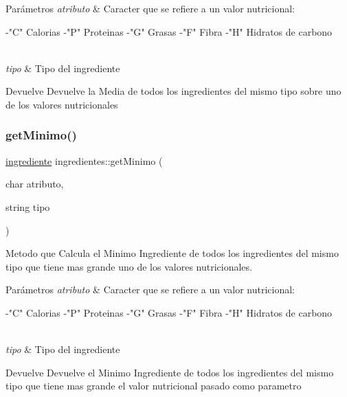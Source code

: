 \begin{DoxyParams}{Parámetros}
{\em atributo} & Caracter que se refiere a un valor nutricional\+: \begin{DoxyVerb}    -"C" Calorias
    -"P" Proteinas
    -"G" Grasas
    -"F" Fibra
    -"H" Hidratos de carbono
\end{DoxyVerb}
\\
\hline
{\em tipo} & Tipo del ingrediente \\
\hline
\end{DoxyParams}
\begin{DoxyReturn}{Devuelve}
Devuelve la Media de todos los ingredientes del mismo tipo sobre uno de los valores nutricionales 
\end{DoxyReturn}
\mbox{\label{classingredientes_a0ec4fb15cad1b31709b24751abdf2067}} 
\subsubsection{\texorpdfstring{get\+Minimo()}{getMinimo()}}
{\footnotesize\ttfamily \hyperlink{classingrediente}{ingrediente} ingredientes\+::get\+Minimo (\begin{DoxyParamCaption}\item[{char}]{atributo,  }\item[{string}]{tipo }\end{DoxyParamCaption})}



Metodo que Calcula el Minimo Ingrediente de todos los ingredientes del mismo tipo que tiene mas grande uno de los valores nutricionales. 


\begin{DoxyParams}{Parámetros}
{\em atributo} & Caracter que se refiere a un valor nutricional\+: \begin{DoxyVerb}    -"C" Calorias
    -"P" Proteinas
    -"G" Grasas
    -"F" Fibra
    -"H" Hidratos de carbono
\end{DoxyVerb}
\\
\hline
{\em tipo} & Tipo del ingrediente \\
\hline
\end{DoxyParams}
\begin{DoxyReturn}{Devuelve}
Devuelve el Minimo Ingrediente de todos los ingredientes del mismo tipo que tiene mas grande el valor nutricional pasado como parametro 
\end{DoxyReturn}
\mbox{\label{classingredientes_a57594cb6c675d23f7894fe6388c95a7f}} 
